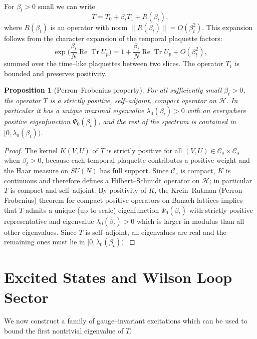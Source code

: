 \documentclass[11pt]{article}
\newtheorem{proposition}[theorem]{Proposition}
\begin{document}
For $\beta_t>0$ small we can write
\begin{equation}
  T = T_0 + \beta_t T_1 + R(\beta_t),
\end{equation}
where $R(\beta_t)$ is an operator with norm $\|R(\beta_t)\|=O(\beta_t^2)$.
This expansion follows from the character expansion of the temporal
plaquette factors:
\begin{equation}
  \exp\Big(\frac{\beta_t}{N}\operatorname{Re}\operatorname{Tr} U_p\Big)
  = 1 + \frac{\beta_t}{N}\operatorname{Re}\operatorname{Tr} U_p
      + O(\beta_t^2),
\end{equation}
summed over the time--like plaquettes between two slices.  The operator
$T_1$ is bounded and preserves positivity.

\begin{proposition}[Perron--Frobenius property]
For all sufficiently small $\beta_t>0$, the operator $T$ is a strictly
positive, self--adjoint, compact operator on $\mathcal{H}$.  In
particular it has a unique maximal eigenvalue $\lambda_0(\beta_t)>0$
with an everywhere positive eigenfunction $\Psi_0(\beta_t)$, and the
rest of the spectrum is contained in $[0,\lambda_0(\beta_t))$.
\end{proposition}

\begin{proof}
The kernel $K(V,U)$ of $T$ is strictly positive for all
$(V,U)\in\mathcal{C}_s\times\mathcal{C}_s$ when $\beta_t>0$, because
each temporal plaquette contributes a positive weight and the Haar
measure on $SU(N)$ has full support.  Since $\mathcal{C}_s$ is compact,
$K$ is continuous and therefore defines a Hilbert--Schmidt operator on
$\mathcal{H}$; in particular $T$ is compact and self--adjoint.  By
positivity of $K$, the Krein--Rutman (Perron--Frobenius) theorem for
compact positive operators on Banach lattices implies that $T$ admits a
unique (up to scale) eigenfunction $\Psi_0(\beta_t)$ with strictly
positive representative and eigenvalue $\lambda_0(\beta_t)>0$ which is
larger in modulus than all other eigenvalues.  Since $T$ is
self--adjoint, all eigenvalues are real and the remaining ones must lie
in $[0,\lambda_0(\beta_t))$.
\end{proof}

\section{Excited States and Wilson Loop Sector}

We now construct a family of gauge--invariant excitations which can be
used to bound the first nontrivial eigenvalue of $T$.
\end{document}
